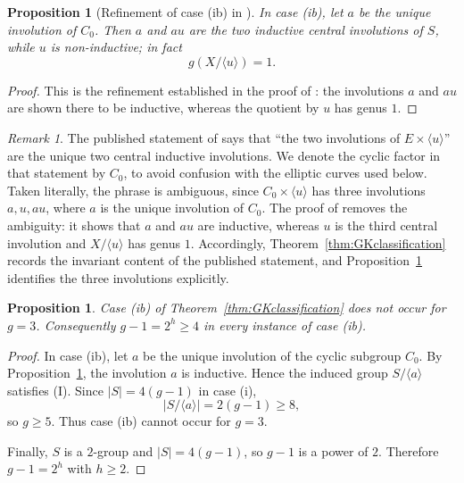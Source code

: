 \documentclass[11pt]{article}
\newtheorem{proposition}[theorem]{Proposition}
\theoremstyle{remark}
\newtheorem{remark}[theorem]{Remark}
\begin{document}
\begin{proposition}[Refinement of case \textup{(ib)} in \cite{GK2015}]
\label{prop:GK-refinement}
In case \textup{(ib)}, let $a$ be the unique involution of $C_0$.
Then $a$ and $au$ are the two inductive central involutions of $S$, while
$u$ is non-inductive; in fact
\[
        g(X/\langle u\rangle)=1.
\]
\end{proposition}

\begin{proof}
This is the refinement established in the proof of
\cite[Theorem~4.3, pp.~277--278]{GK2015}: the involutions $a$ and $au$
are shown there to be inductive, whereas the quotient by $u$ has genus
$1$.
\end{proof}

\begin{remark}\label{rem:GK-reading}
The published statement of \cite[Theorem~1.2(ib)]{GK2015} says that
``the two involutions of $E\times\langle u\rangle$'' are the unique two
central inductive involutions.  We denote the cyclic factor in that
statement by $C_0$, to avoid confusion with the elliptic curves used below.
Taken literally, the phrase is ambiguous, since
$C_0\times\langle u\rangle$ has three involutions $a,u,au$, where $a$ is
the unique involution of $C_0$.  The proof of
\cite[Theorem~4.3, pp.~277--278]{GK2015} removes the ambiguity: it shows
that $a$ and $au$ are inductive, whereas $u$ is the third central
involution and $X/\langle u\rangle$ has genus $1$.  Accordingly,
Theorem~\ref{thm:GKclassification} records the invariant content of the
published statement, and Proposition~\ref{prop:GK-refinement} identifies
the three involutions explicitly.
\end{remark}

\begin{proposition}\label{prop:no-genus3}
Case \textup{(ib)} of Theorem~\ref{thm:GKclassification} does not occur
for $g=3$.  Consequently $g-1=2^h\ge4$ in every instance of case
\textup{(ib)}.
\end{proposition}

\begin{proof}
In case \textup{(ib)}, let $a$ be the unique involution of the cyclic
subgroup $C_0$.  By Proposition~\ref{prop:GK-refinement}, the involution $a$ is
inductive.  Hence the induced group $S/\langle a\rangle$ satisfies
\textup{(I)}.  Since $|S|=4(g-1)$ in case \textup{(i)},
\[
        |S/\langle a\rangle|=2(g-1)\ge8,
\]
so $g\ge5$.  Thus case \textup{(ib)} cannot occur for $g=3$.

Finally, $S$ is a $2$-group and $|S|=4(g-1)$, so $g-1$ is a power of
$2$.  Therefore $g-1=2^h$ with $h\ge2$.
\end{proof}
\end{document}
